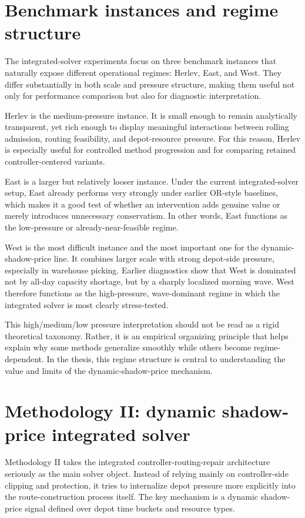 \section{Benchmark instances and regime structure}

The integrated-solver experiments focus on three benchmark instances that naturally expose different operational regimes: Herlev, East, and West. They differ substantially in both scale and pressure structure, making them useful not only for performance comparison but also for diagnostic interpretation.

Herlev is the medium-pressure instance. It is small enough to remain analytically transparent, yet rich enough to display meaningful interactions between rolling admission, routing feasibility, and depot-resource pressure. For this reason, Herlev is especially useful for controlled method progression and for comparing retained controller-centered variants.

East is a larger but relatively looser instance. Under the current integrated-solver setup, East already performs very strongly under earlier OR-style baselines, which makes it a good test of whether an intervention adds genuine value or merely introduces unnecessary conservatism. In other words, East functions as the low-pressure or already-near-feasible regime.

West is the most difficult instance and the most important one for the dynamic-shadow-price line. It combines larger scale with strong depot-side pressure, especially in warehouse picking. Earlier diagnostics show that West is dominated not by all-day capacity shortage, but by a sharply localized morning wave. West therefore functions as the high-pressure, wave-dominant regime in which the integrated solver is most clearly stress-tested.

This high/medium/low pressure interpretation should not be read as a rigid theoretical taxonomy. Rather, it is an empirical organizing principle that helps explain why some methods generalize smoothly while others become regime-dependent. In the thesis, this regime structure is central to understanding the value and limits of the dynamic-shadow-price mechanism.

\section{Methodology II: dynamic shadow-price integrated solver}

Methodology II takes the integrated controller-routing-repair architecture seriously as the main solver object. Instead of relying mainly on controller-side clipping and protection, it tries to internalize depot pressure more explicitly into the route-construction process itself. The key mechanism is a dynamic shadow-price signal defined over depot time buckets and resource types.

